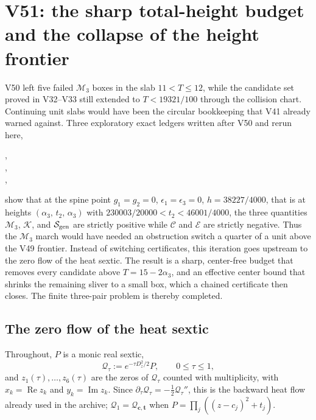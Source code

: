 \documentclass[11pt]{article}
\theoremstyle{definition}
\theoremstyle{remark}
\begin{document}
\clearpage
\section{V51: the sharp total-height budget and the collapse of the height frontier}
\label{sec:f2v51-total-height}
\begingroup
\setcounter{equation}{0}
\renewcommand{\theequation}{N51.\arabic{equation}}
\renewcommand{\theHequation}{f2v51.\arabic{equation}}

V50 left five failed \(\mathcal M_3\) boxes in the slab \(11<T\le12\),
while the candidate set proved in V32--V33 still extended to
\(T<19321/100\) through the collision chart.  Continuing unit slabs would
have been the circular bookkeeping that V41 already warned against.  Three
exploratory exact ledgers written after V50 and rerun here,
\begin{center}
,\\
,\\
,
\end{center}
show that at the spine point \(g_1=g_2=0\), \(\epsilon_1=\epsilon_3=0\),
\(h=38227/4000\), that is at heights
\((\alpha_3,\,t_2,\,\alpha_3)\) with \(230003/20000<t_2<46001/4000\),
the three quantities \(\mathcal M_3\), \(\mathcal K\), and
\(\mathcal S_{\rm gen}\) are strictly positive while \(\mathcal C\) and
\(\mathcal E\) are strictly negative.  Thus the \(\mathcal M_3\) march
would have needed an obstruction switch a quarter of a unit above the
V49 frontier.  Instead of switching certificates, this iteration goes
upstream to the zero flow of the heat sextic.  The result is a sharp,
center-free budget that removes every candidate above
\(T=15-2\alpha_3\), and an effective center bound that shrinks the
remaining sliver to a small box, which a chained certificate then closes.
The finite three-pair problem is thereby completed.

\subsection{The zero flow of the heat sextic}

Throughout, \(P\) is a monic real sextic,
\begin{equation}
 \mathcal Q_\tau:=e^{-\tau D_z^2/2}P,\qquad 0\le\tau\le1,
 \label{eq:f2v51-flow-def}
\end{equation}
and \(z_1(\tau),\ldots,z_6(\tau)\) are the zeros of \(\mathcal Q_\tau\)
counted with multiplicity, with \(x_k=\operatorname{Re}z_k\) and
\(y_k=\operatorname{Im}z_k\).  Since \(\partial_\tau\mathcal Q_\tau
=-\tfrac12\mathcal Q_\tau''\), this is the backward heat flow already used
in the archive; \(\mathcal Q_1=\mathcal Q_{\bm c,\bm t}\) when
\(P=\prod_j((z-c_j)^2+t_j)\).
\end{document}
